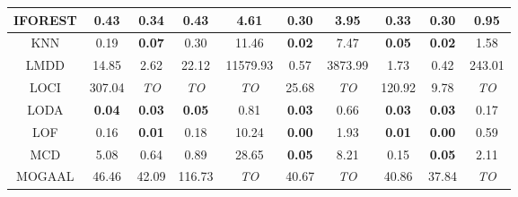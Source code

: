 \begin{table*}[!t]
\begin{tabular}{|c|c|c|c|c|c|c|c|c|c|}
\hline
                IFOREST &                         0.43 &                      0.34 &                     0.43 &                    4.61 &                    0.30 &                   3.95 &                         0.33 &                     0.30 &                          0.95 \\
\hline
                        KNN &                         0.19 &             \textbf{0.07} &                     0.30 &                   11.46 &           \textbf{0.02} &                   7.47 &                \textbf{0.05} &            \textbf{0.02} &                          1.58 \\
\hline
                        LMDD &                        14.85 &                      2.62 &                    22.12 &                11579.93 &                    0.57 &                3873.99 &                         1.73 &                     0.42 &                        243.01 \\
\hline
                        LOCI &                       307.04 &               \textit{TO} &              \textit{TO} &             \textit{TO} &                   25.68 &            \textit{TO} &                       120.92 &                     9.78 &                   \textit{TO} \\
\hline
                        LODA &                \textbf{0.04} &             \textbf{0.03} &            \textbf{0.05} &                    0.81 &           \textbf{0.03} &                   0.66 &                \textbf{0.03} &            \textbf{0.03} &                          0.17 \\
\hline
                        LOF &                         0.16 &             \textbf{0.01} &                     0.18 &                   10.24 &           \textbf{0.00} &                   1.93 &                \textbf{0.01} &            \textbf{0.00} &                          0.59 \\
\hline
                        MCD &                         5.08 &                      0.64 &                     0.89 &                   28.65 &           \textbf{0.05} &                   8.21 &                         0.15 &            \textbf{0.05} &                          2.11 \\
\hline
                        MOGAAL &                        46.46 &                     42.09 &                   116.73 &             \textit{TO} &                   40.67 &            \textit{TO} &                        40.86 &                    37.84 &                   \textit{TO} \\

\end{tabular}
\end{table*}
